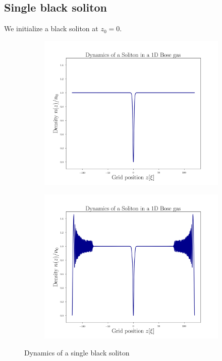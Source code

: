 \subsection{Single black soliton}
We initialize a black soliton at $z_0 = 0$.
 \begin{figure}[H]
 \centering
 \begin{subfigure}{0.42\textwidth} 
 	\includegraphics[width= \textwidth]{figures/single_black_0}
 \end{subfigure}
 \begin{subfigure}{0.42\textwidth} 
 	\includegraphics[width= \textwidth]{figures/single_black_150}
 \end{subfigure}
 \caption{Dynamics of a single black soliton}	
 \end{figure}
 \newpage
